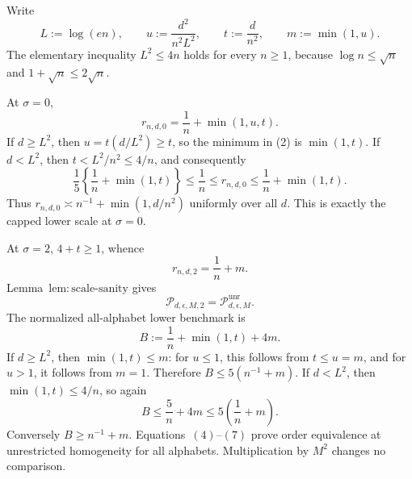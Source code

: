 Write
\[
 L:=\log(en),\qquad u:=\frac{d^2}{n^2L^2},
 \qquad t:=\frac d{n^2},\qquad m:=\min(1,u).
\tag{1}
\]
The elementary inequality \(L^2\le4n\) holds for every \(n\ge1\), because \(\log n\le\sqrt n\) and \(1+\sqrt n\le2\sqrt n\).

At \(\sigma=0\),
\[
 r_{n,d,0}=\frac1n+\min(1,u,t).
\tag{2}
\]
If \(d\ge L^2\), then \(u=t(d/L^2)\ge t\), so the minimum in (2) is \(\min(1,t)\).  If \(d<L^2\), then \(t<L^2/n^2\le4/n\), and consequently
\[
 \frac15\left\{\frac1n+\min(1,t)\right\}
 \le\frac1n\le r_{n,d,0}
 \le\frac1n+\min(1,t).
\tag{3}
\]
Thus \(r_{n,d,0}\asymp n^{-1}+\min(1,d/n^2)\) uniformly over all \(d\).  This is exactly the capped lower scale at \(\sigma=0\).

At \(\sigma=2\), \(4+t\ge1\), whence
\[
 r_{n,d,2}=\frac1n+m.
\tag{4}
\]
Lemma~\(\mathrm{lem:scale\text{-}sanity}\) gives
\[
 \mathcal P_{d,\epsilon,M,2}=\mathcal P_{d,\epsilon,M}^{\mathrm{unr}}.
\tag{5}
\]
The normalized all-alphabet lower benchmark is
\[
 B:=\frac1n+\min(1,t)+4m.
\tag{6}
\]
If \(d\ge L^2\), then \(\min(1,t)\le m\): for \(u\le1\), this follows from \(t\le u=m\), and for \(u>1\), it follows from \(m=1\).  Therefore \(B\le5(n^{-1}+m)\).  If \(d<L^2\), then \(\min(1,t)\le4/n\), so again
\[
 B\le\frac5n+4m\le5\left(\frac1n+m\right).
\tag{7}
\]
Conversely \(B\ge n^{-1}+m\).  Equations~\((4)\)--\((7)\) prove order equivalence at unrestricted homogeneity for all alphabets.  Multiplication by \(M^2\) changes no comparison.